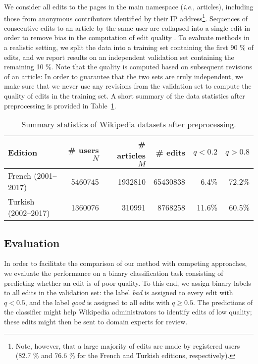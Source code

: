 We consider all edits to the pages in the main namespace (\textit{i.e.}, articles), including those from anonymous contributors identified by their IP address\footnote{%
	Note, however, that a large majority of edits are made by registered users (\num{82.7} \% and \num{76.6} \% for the French and Turkish editions, respectively).}.
Sequences of consecutive edits to an article by the same user are collapsed into a single edit in order to remove bias in the computation of edit quality \citep{adler2007content}.
To evaluate methods in a realistic setting, we split the data into a training set containing the first \num{90} \% of edits, and we report results on an independent validation set containing the remaining \num{10} \%.
Note that the quality is computed based on subsequent revisions of an article:
In order to guarantee that the two sets are truly independent, we make sure that we never use any revisions from the validation set to compute the quality of edits in the training set.
A short summary of the data statistics after preprocessing is provided in Table~\ref{pps:tab:wikidata}.

\begin{table}
	\caption{Summary statistics of Wikipedia datasets after preprocessing.}
	\label{pps:tab:wikidata}
	\begin{tabular}{lrrrrr}
		\toprule
		Edition              & \# users $N$  & \# articles $M$ & \# edits       & $q < 0.2$    & $q > 0.8$    \\
		\midrule
		French  (2001--2017) & \num{5460745} & \num{1932810}   & \num{65430838} & \num{6.4}\%  & \num{72.2}\% \\
		Turkish (2002--2017) & \num{1360076} & \num{310991}    & \num{8768258}  & \num{11.6}\% & \num{60.5}\% \\
		\bottomrule
	\end{tabular}
\end{table}


\subsection{Evaluation}

In order to facilitate the comparison of our method with competing approaches, we evaluate the performance on a binary classification task consisting of predicting whether an edit is of poor quality.
To this end, we assign binary labels to all edits in the validation set: the label \emph{bad} is assigned to every edit with $q < 0.5$, and the label \emph{good} is assigned to all edits with $q \ge 0.5$.
The predictions of the classifier might help Wikipedia administrators to identify edits of low quality;
these edits might then be sent to domain experts for review.

